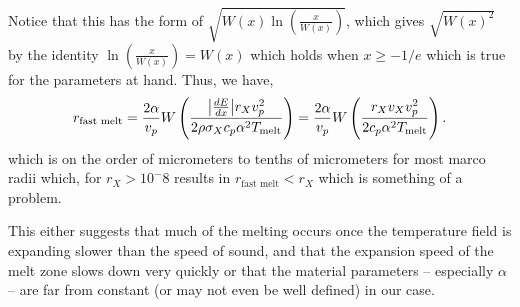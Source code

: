 \documentclass{article}
\newcommand*\te[1]{\text{#1}}
\newcommand*\p[1]{\left(#1\right)}
\newcommand*\f[2]{\frac{#1}{#2}}
\begin{document}
Notice that this has the form of $\sqrt{W(x)\ln\p{{\frac{x}{W(x)}}}}$, which gives $\sqrt{W(x)^2}$ by the identity $\ln\p{{\frac{x}{W(x)}}} = W(x)$ which holds when $x \geq -1/e$ which is true for the parameters at hand.  Thus, we have,
\begin{align}
r_\te{fast melt} =\frac{2\alpha}{v_p}W\p{{\f{\abs{\frac{dE}{dx}}r_{X}v_p^2}{2 \rho \sigma_X c_p \alpha^2 T_\te{melt}}}} = \frac{2\alpha}{v_p}W\p{\frac{r_{X}v_{X} v_p^2}{2 c_p \alpha^2 T_\te{melt}}}.
\end{align}
which is on the order of micrometers to tenths of micrometers for most marco radii which, for $r_X > 10^-8$ results in $r_\te{fast melt} < r_X$ which is something of a problem.

This either suggests that much of the melting occurs once the temperature field is expanding slower than the speed of sound, and that the expansion speed of the melt zone slows down very quickly or that the material parameters -- especially $\alpha$ -- are far from constant (or may not even be well defined) in our case. 
\end{document}
